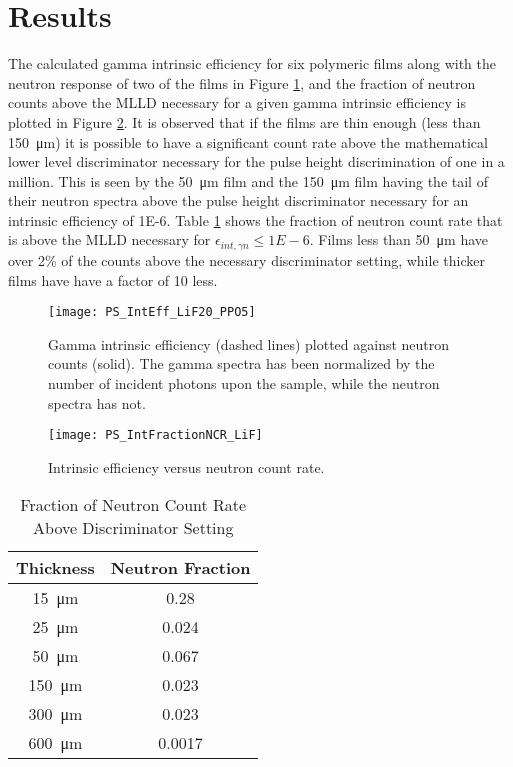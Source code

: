 \section{Results}
\label{sec:Results}
The calculated gamma intrinsic efficiency for six polymeric films along with the neutron response of two of the films in Figure \ref{fig:GammaIntrNeutronCounts}, and the fraction of neutron counts above the MLLD necessary for a given gamma intrinsic efficiency is plotted in Figure \ref{fig:crVsIntEff}.
It is observed that if the films are thin enough (less than \SI{150}{\um}) it is possible to have a significant count rate above the mathematical lower level discriminator necessary for the pulse height discrimination of one in a million.
This is seen by the \SI{50}{\um} film and the \SI{150}{\um} film having the tail of their neutron spectra above the pulse height discriminator necessary for an intrinsic efficiency of \num{1E-6}.
Table \ref{tab:FractionCRGamma} shows the fraction of neutron count rate that is above the MLLD necessary for $\epsilon_{int,\gamma n} \le \si{1E-6}$.
Films less than \SI{50}{\um} have over 2\% of the counts above the necessary discriminator setting, while thicker films have have a factor of 10 less.
\begin{figure}[ht]
    \centering
    \texttt{[image: PS\_IntEff\_LiF20\_PPO5]}
    \caption[PS Gamma intrinsic efficiency and neutron count rate]{Gamma intrinsic efficiency (dashed lines) plotted against neutron counts (solid). The gamma spectra has been normalized by the number of incident photons upon the sample, while the neutron spectra has not.}
    \label{fig:GammaIntrNeutronCounts}
\end{figure}
\begin{figure}[ht]
    \centering
    \texttt{[image: PS\_IntFractionNCR\_LiF]}
    \caption{Intrinsic efficiency versus neutron count rate. }
    \label{fig:crVsIntEff}
\end{figure}
\begin{table}[]
    \caption{Fraction of Neutron Count Rate Above Discriminator Setting}
	\centering
	\begin{tabular}{c | c}
	Thickness & Neutron Fraction \\
	\hline
	\hline
	\SI{15}{\um} & 0.28 \\
	\SI{25}{\um} & 0.024 \\
	\SI{50}{\um}  & 0.067 \\
	\SI{150}{\um}  & 0.023 \\
	\SI{300}{\um}  & 0.023 \\
	\SI{600}{\um}  & 0.0017 \\
	\end{tabular}
  \label{tab:FractionCRGamma}
\end{table}
